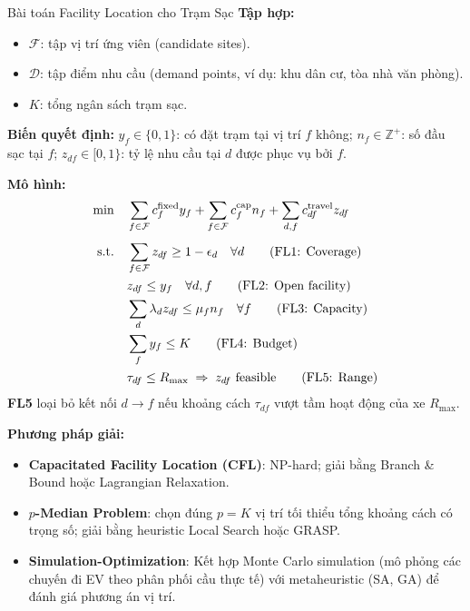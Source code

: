 \documentclass[12pt,a4paper]{article}
\begin{document}
\begin{definitionbox}{Bài toán Facility Location cho Trạm Sạc}
\textbf{Tập hợp:}
\begin{itemize}
  \item $\mathcal{F}$: tập vị trí ứng viên (candidate sites).
  \item $\mathcal{D}$: tập điểm nhu cầu (demand points, ví dụ: khu dân cư, tòa nhà văn phòng).
  \item $K$: tổng ngân sách trạm sạc.
\end{itemize}

\textbf{Biến quyết định:}
$y_f\in\{0,1\}$: có đặt trạm tại vị trí $f$ không;
$n_f\in\mathbb{Z}^+$: số đầu sạc tại $f$;
$z_{df}\in[0,1\}$: tỷ lệ nhu cầu tại $d$ được phục vụ bởi $f$.

\textbf{Mô hình:}
\begin{align}
  \min\quad & \sum_{f\in\mathcal{F}} c_f^{\mathrm{fixed}} y_f
              + \sum_{f\in\mathcal{F}} c_f^{\mathrm{cap}} n_f
              + \sum_{d,f} c_{df}^{\mathrm{travel}} z_{df} \notag\\[4pt]
  \text{s.t.}\quad
  & \sum_{f\in\mathcal{F}} z_{df} \geq 1 - \epsilon_d \quad\forall d \tag{FL1: Coverage}\\
  & z_{df} \leq y_f \quad\forall d,f \tag{FL2: Open facility}\\
  & \sum_d \lambda_d z_{df} \leq \mu_f n_f \quad\forall f \tag{FL3: Capacity}\\
  & \sum_{f} y_f \leq K \tag{FL4: Budget}\\
  & \tau_{df} \leq R_{\max} \;\Rightarrow\; z_{df}\text{ feasible} \tag{FL5: Range}
\end{align}
\textbf{FL5} loại bỏ kết nối $d\to f$ nếu khoảng cách $\tau_{df}$ vượt tầm hoạt động
của xe $R_{\max}$.
\end{definitionbox}

\textbf{Phương pháp giải:}
\begin{itemize}
  \item \textbf{Capacitated Facility Location (CFL)}: NP-hard; giải bằng Branch \& Bound
    hoặc Lagrangian Relaxation.
  \item \textbf{$p$-Median Problem}: chọn đúng $p=K$ vị trí tối thiểu tổng khoảng cách
    có trọng số; giải bằng heuristic Local Search hoặc GRASP.
  \item \textbf{Simulation-Optimization}: Kết hợp Monte Carlo simulation (mô phỏng
    các chuyến đi EV theo phân phối cầu thực tế) với metaheuristic (SA, GA) để
    đánh giá phương án vị trí.
\end{itemize}
\end{document}
